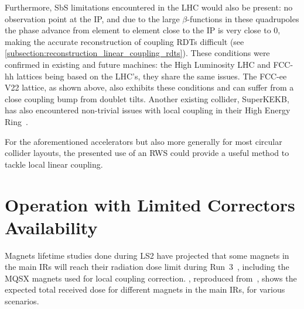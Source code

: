Furthermore, SbS limitations encountered in the LHC would also be present: no observation point at the IP, and due to the large \(\beta\)-functions in these quadrupoles the phase advance from element to element close to the IP is very close to \num{0}, making the accurate reconstruction of coupling RDTs difficult (see \cref{subsection:reconstruction_linear_coupling_rdts}).
These conditions were confirmed in existing and future machines: the High Luminosity LHC and FCC-hh lattices being based on the LHC's, they share the same issues.
The FCC-ee V\num{22} lattice, as shown above, also exhibits these conditions and can suffer from a close coupling bump from doublet tilts.
Another existing collider, SuperKEKB, has also encountered non-trivial issues with local coupling in their High Energy Ring~\cite{ICFA:Morita:Optics_Corrections_including_IP_Local_Coupling_at_SuperKEKB}.

For the aforementioned accelerators but also more generally for most circular collider layouts, the presented use of an RWS could provide a useful method to tackle local linear coupling.

\section{Operation with Limited Correctors Availability}
\label{section:limited_correctors_availability}

Magnets lifetime studies done during LS\num{2} have projected that some magnets in the main IRs will reach their radiation dose limit during Run~\num{3}~\cite{PRES:Cerutti:TripletLifetime_Evian}, including the MQSX magnets used for local coupling correction.
, reproduced from~\cite{PRES:Cerutti:TripletLifetime_Evian}, shows the expected total received dose for different magnets in the main IRs, for various scenarios.

